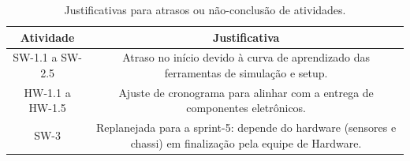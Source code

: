 \begin{landscape}
\begin{center}
\begin{footnotesize}
\begin{longtable}{|p{6.5cm}|c|c|c|c|c|p{4cm}|}
\end{longtable}
\end{footnotesize}
\end{center}

\begin{table}[H]
\begin{center}
\caption{Justificativas para atrasos ou não-conclusão de atividades.}
\label{tab:justificativas-cronograma}
\begin{tabular}{|c|c|} \hline
\textbf{Atividade} & \textbf{Justificativa}  \\ \hline 
    SW-1.1 a SW-2.5 &
    Atraso no início devido à curva de aprendizado das ferramentas de simulação e setup. \\ \hline
    HW-1.1 a HW-1.5 &
    Ajuste de cronograma para alinhar com a entrega de componentes eletrônicos. \\ \hline
    SW-3 &
    Replanejada para a sprint-5: depende do hardware (sensores e chassi) em finalização pela equipe de Hardware. \\ \hline
\end{tabular}
\end{center}
\end{table}

\end{landscape}